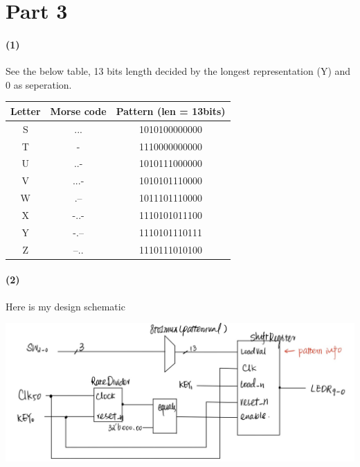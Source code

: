 \documentclass{article}
\begin{document}
\section*{Part 3}
\paragraph{(1)} See the below table, 13 bits length decided by the longest representation (Y) and 0 as seperation.
\begin{center}
    \begin{tabular}{|c|c|c|}
    \hline
    Letter & Morse code & Pattern (len = 13bits) \\ \hline
    S      & ...        & 1010100000000         \\ \hline
    T      & -          & 1110000000000         \\ \hline
    U      & ..-        & 1010111000000         \\ \hline
    V      & ...-       & 1010101110000         \\ \hline
    W      & .--        & 1011101110000         \\ \hline
    X      & -..-       & 1110101011100         \\ \hline
    Y      & -.--       & 1110101110111         \\ \hline
    Z      & --..       & 1110111010100         \\ \hline
    \end{tabular}
\end{center}

\paragraph{(2)} Here is my design schematic
\begin{center}
	\includegraphics[scale=0.25]{q3_scheme.jpg}
\end{center}
\end{document}
